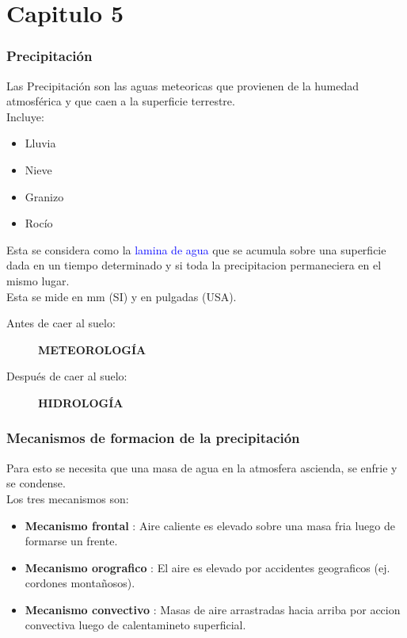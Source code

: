 \part{Capitulo 5}

\section{Precipitación}

Las Precipitación son las aguas meteoricas que provienen de la humedad atmosférica y que caen a la superficie terrestre.\\
Incluye: 
\begin{itemize}
    \item Lluvia
    \item Nieve
    \item Granizo
    \item Rocío
\end{itemize}

Esta se considera como la \textcolor{blue}{lamina de agua} que se acumula sobre una superficie dada en un tiempo determinado y si toda la precipitacion permaneciera en el mismo lugar.\\
Esta se mide en mm (SI) y en pulgadas (USA).\\

\begin{description}
    \item[Antes de caer al suelo:] \textbf{METEOROLOGÍA}
    \item[Después de caer al suelo:] \textbf{HIDROLOGÍA}
\end{description}

\section{Mecanismos de formacion de la precipitación}

Para esto se necesita que una masa de agua en la atmosfera ascienda, se enfrie y se condense.\\
Los tres mecanismos son:
\begin{itemize}
    \item \textbf{Mecanismo frontal} : Aire caliente es elevado sobre una masa fria luego de formarse un frente.
    \item \textbf{Mecanismo orografico} : El aire es elevado por accidentes geograficos (ej. cordones montañosos).
    \item \textbf{Mecanismo convectivo} : Masas de aire arrastradas hacia arriba por accion convectiva luego de calentamineto superficial.
\end{itemize}


